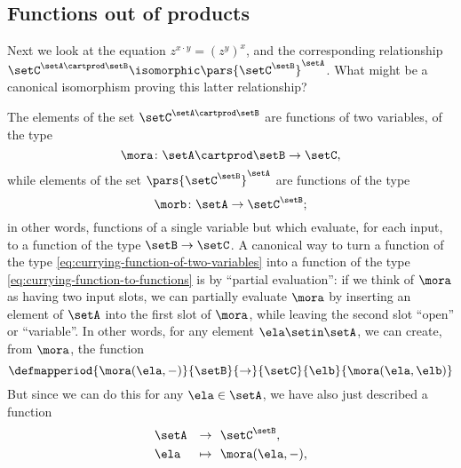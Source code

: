 \begin{solution}
\end{solution}

\subsection{Functions out of products}

Next we look at the equation $z^{x \cdot y} = (z^y)^x$, and the corresponding relationship $ \setC^{\setA \cartprod \setB}  \isomorphic \pars{\setC^\setB}^\setA$. What might be a canonical isomorphism proving this latter relationship?

The elements of the set $ \setC^{\setA \cartprod \setB}$ are functions of two variables, of the type
\begin{equation}\label{eq:currying-function-of-two-variables}
\mora \colon \setA \cartprod \setB \to \setC, 
\end{equation}
while elements of the set $\pars{\setC^\setB}^\setA$ are functions of the type
\begin{equation} \label{eq:currying-function-to-functions}
\morb \colon \setA \to \setC^\setB;
\end{equation}
in other words, functions of a single variable but which evaluate, for each input, to a function of the type $\setB \to \setC$. A canonical way to turn a function of the type \cref{eq:currying-function-of-two-variables} into a function of the type \cref{eq:currying-function-to-functions} is by ``partial evaluation'': if we think of $\mora$ as having two input slots, we can partially evaluate $\mora$ by inserting an element of $\setA$ into the first slot of $\mora$, while leaving the second slot ``open'' or ``variable''. In other words, for any element $\ela \setin \setA$, we can create, from $\mora$, the function 
\begin{equation}
 \defmapperiod{
           \mora(\ela, -)
        }{
            \setB 
        }{
            \to
        }{
           \setC 
        }{
            \elb
        }{
            \mora (\ela, \elb)
        }
\end{equation}
But since we can do this for any $\ela \in \setA$, we have also just described a function
\begin{equation}
\begin{aligned}
          & \setA & \to & \ \ \setC^\setB, \\
         & \ela & \mapsto & \ \  \mora ( \ela, -),
\end{aligned}
\end{equation}
